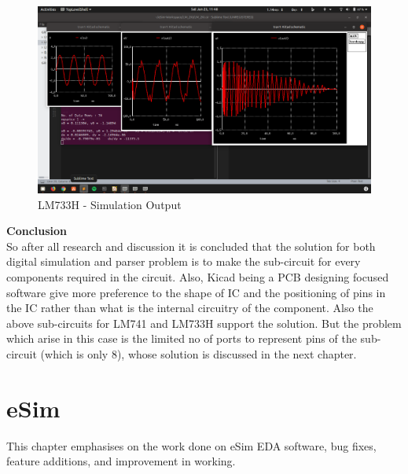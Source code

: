 \documentclass[12pt,a4paper]{report}
\begin{document}
\vspace{5mm}
\begin{figure}[h]
	\centering
	\includegraphics[width=\textwidth]{lm733h_sim}
	\caption{LM733H - Simulation Output}
\end{figure}
\vspace{5mm}
\textbf{\Large Conclusion}
\vspace{5mm}
\\
So after all research and discussion it is concluded that the solution for both digital simulation and parser problem is to make the sub-circuit for every components required in the circuit. Also, Kicad being a PCB designing focused software give more preference to the shape of IC and the positioning of pins in the IC rather than what is the internal circuitry of the component. Also the above sub-circuits for LM741 and LM733H support the solution. But the problem which arise in this case is the limited no of ports to represent pins of the sub-circuit (which is only 8), whose solution is discussed in the next chapter.



\chapter{\textbf{eSim}}
This chapter emphasises on the work done on eSim EDA software, bug fixes, feature additions, and improvement in working.
\end{document}

